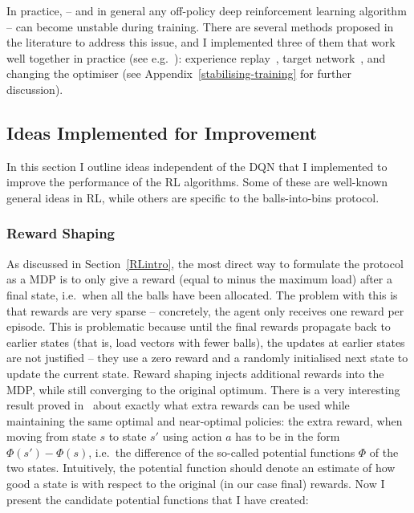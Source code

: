 In practice, \DQL -- and in general any off-policy deep reinforcement learning algorithm -- can become unstable during training. There are several methods proposed in the literature to address this issue, and I implemented three of them that work well together in practice (see e.g.~\cite{mnih2015dqnstabilitycombined}): experience replay~\cite{lin1992experiencereplay}, target network~\cite{argueta1992targetnetwork}, and changing the optimiser (see Appendix~\ref{stabilising-training} for further discussion).


\subsection{Ideas Implemented for Improvement} \label{improvementideas}


In this section I outline ideas independent of the DQN that I implemented to improve the performance of the RL algorithms. Some of these are well-known general ideas in RL, while others are specific to the \TwoThinning balls-into-bins protocol.


\subsubsection*{Reward Shaping} \label{rewardshaping}

As discussed in Section~\ref{RLintro}, the most direct way to formulate the \TwoThinning protocol as a MDP is to only give a reward (equal to minus the maximum load) after a final state, i.e.\ when all the balls have been allocated. The problem with this is that rewards are very sparse -- concretely, the agent only receives one reward per episode. This is problematic because until the final rewards propagate back to earlier states (that is, load vectors with fewer balls), the updates at earlier states are not justified -- they use a zero reward and a randomly initialised next state to update the current state. Reward shaping injects additional rewards into the MDP, while still converging to the original optimum. There is a very interesting result proved in~\cite{ng1999rewardshaping} about exactly what extra rewards can be used while maintaining the same optimal and near-optimal policies: the extra reward, when moving from state $s$ to state $s'$ using action $a$ has to be in the form $\Phi(s')-\Phi(s)$, i.e.\ the difference of the so-called potential functions $\Phi$ of the two states. Intuitively, the potential function should denote an estimate of how good a state is with respect to the original (in our case final) rewards. Now I present the candidate potential functions that I have created:

